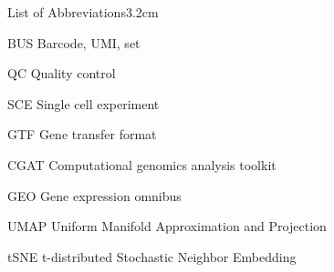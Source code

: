 \begin{mclistof}{List of Abbreviations}{3.2cm}
\item[BUS] Barcode, UMI, set

\item[QC] Quality control

\item[SCE] Single cell experiment

\item[GTF] Gene transfer format

\item[CGAT] Computational genomics analysis toolkit

\item[GEO] Gene expression omnibus

\item[UMAP] Uniform Manifold Approximation and Projection

\item[tSNE] t-distributed Stochastic Neighbor Embedding

\end{mclistof} 
